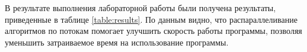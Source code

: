 \Conclusion %
В результате выполнения лабораторной работы были получена результаты, приведенные в таблице \ref{table:results}. По данным видно, что распараллеливание алгоритмов по потокам помогает улучшить скорость работы программы, позволяя уменьшить затраиваемое время на использование программы.  

